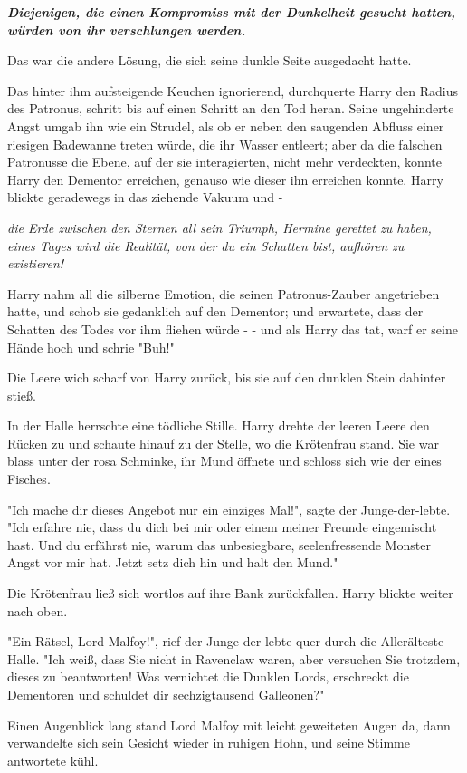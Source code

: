 {\textbf{\emph{Diejenigen, die einen Kompromiss mit der Dunkelheit gesucht hatten, würden von ihr verschlungen werden.}}

Das war die andere Lösung, die sich seine dunkle Seite ausgedacht hatte.

Das hinter ihm aufsteigende Keuchen ignorierend, durchquerte Harry den Radius des Patronus, schritt bis auf einen Schritt an den Tod heran. Seine ungehinderte Angst umgab ihn wie ein Strudel, als ob er neben den saugenden Abfluss einer riesigen Badewanne treten würde, die ihr Wasser entleert; aber da die falschen Patronusse die Ebene, auf der sie interagierten, nicht mehr verdeckten, konnte Harry den Dementor erreichen, genauso wie dieser ihn erreichen konnte. Harry blickte geradewegs in das ziehende Vakuum und -

\emph{die Erde zwischen den Sternen all sein Triumph, Hermine gerettet zu haben, eines Tages wird die Realität, von der du ein Schatten bist, aufhören zu existieren!}

Harry nahm all die silberne Emotion, die seinen Patronus-Zauber angetrieben hatte, und schob sie gedanklich auf den Dementor; und erwartete, dass der Schatten des Todes vor ihm fliehen würde - - und als Harry das tat, warf er seine Hände hoch und schrie "Buh!"

Die Leere wich scharf von Harry zurück, bis sie auf den dunklen Stein dahinter stieß.

In der Halle herrschte eine tödliche Stille. Harry drehte der leeren Leere den Rücken zu und schaute hinauf zu der Stelle, wo die Krötenfrau stand. Sie war blass unter der rosa Schminke, ihr Mund öffnete und schloss sich wie der eines Fisches.

"Ich mache dir dieses Angebot nur ein einziges Mal!", sagte der Junge-der-lebte. "Ich erfahre nie, dass du dich bei mir oder einem meiner Freunde eingemischt hast. Und du erfährst nie, warum das unbesiegbare, seelenfressende Monster Angst vor mir hat. Jetzt setz dich hin und halt den Mund."

Die Krötenfrau ließ sich wortlos auf ihre Bank zurückfallen. Harry blickte weiter nach oben.

"Ein Rätsel, Lord Malfoy!", rief der Junge-der-lebte quer durch die Allerälteste Halle. "Ich weiß, dass Sie nicht in Ravenclaw waren, aber versuchen Sie trotzdem, dieses zu beantworten! Was vernichtet die Dunklen Lords, erschreckt die Dementoren und schuldet dir sechzigtausend Galleonen?"

Einen Augenblick lang stand Lord Malfoy mit leicht geweiteten Augen da, dann verwandelte sich sein Gesicht wieder in ruhigen Hohn, und seine Stimme antwortete kühl.

}

